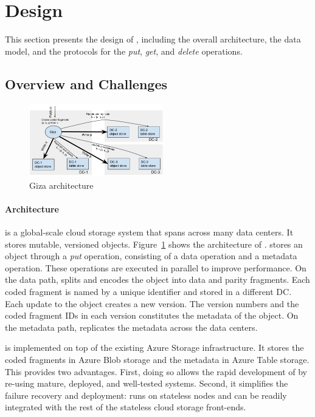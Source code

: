 \section{Design}
\label{sec:design}

This section presents the design of {\name}, including the overall architecture,
the data model, and the protocols for the {\em put}, {\em get}, and {\em delete} operations.

\subsection{Overview and Challenges}

\begin{figure}[tp]
\centering
\includegraphics[width=0.52\textwidth]{fig/Giza}
\caption{Giza architecture\label{fig:arch}}
\end{figure}

\paragraph{Architecture}
{\name} is a global-scale cloud storage system that spans across many data
centers. It stores mutable, versioned objects. Figure~\ref{fig:arch} shows the
architecture of \name. \name stores an object through a {\em put} operation, consisting of a data operation and a metadata operation. These operations are executed in parallel to improve performance. On the data path, \name splits and
encodes the object into data and parity fragments.
Each coded fragment is named by a unique identifier and stored in a different DC.
Each update to the object creates a new version. The version
numbers and the coded fragment IDs in each version constitutes the
metadata of the object. On the metadata path, \name replicates the metadata
across the data centers.

\name is implemented on top of the existing Azure Storage infrastructure.
It stores the coded fragments in Azure Blob storage 
and the metadata in Azure Table storage.
This provides two advantages. First, doing so allows the rapid development of \name
by re-using mature, deployed, and well-tested systems. Second, it simplifies the
failure recovery and deployment: \name runs on stateless nodes and can be readily
integrated with the rest of the stateless cloud storage front-ends.

